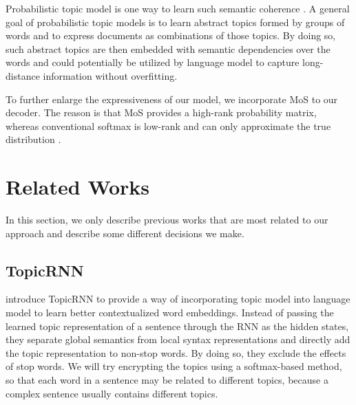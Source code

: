 \documentclass[11pt,a4paper]{article}
\begin{document}
Probabilistic topic model is one way to learn such semantic coherence \citep{blei2009topic}. A general goal of probabilistic topic models is to learn abstract topics formed by groups of words and to express documents as combinations of those topics. By doing so, such abstract topics are then embedded with semantic dependencies over the words and could potentially be utilized by language model to capture long-distance information without overfitting.

To further enlarge the expressiveness of our model, we incorporate MoS to our decoder. The reason is that MoS provides a high-rank probability matrix, whereas conventional softmax is low-rank and can only approximate the true distribution \citet{yang2017breaking}.

\section{Related Works}
\label{sec:related_works}
In this section, we only describe previous works that are most related to our approach and describe some different decisions we make.

\subsection{TopicRNN \citep{dieng2016topicrnn}}
\label{subsec:topicrnn}
\citet{dieng2016topicrnn} introduce TopicRNN to provide a way of incorporating topic model into language model to learn better contextualized word embeddings. Instead of passing the learned topic representation of a sentence through the RNN as the hidden states, they separate global semantics from local syntax representations and directly add the topic representation to non-stop words. By doing so, they exclude the effects of stop words. We will try encrypting the topics using a softmax-based method, so that each word in a sentence may be related to different topics, because a complex sentence usually contains different topics.
\end{document}
